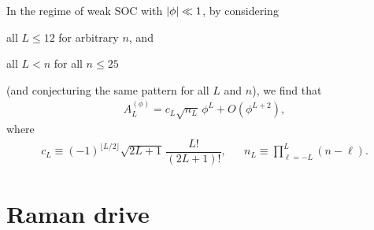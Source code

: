 \documentclass[nofootinbib,notitlepage,11pt]{revtex4-2}
\newcommand{\f}[2]{\dfrac{#1}{#2}} %
\newcommand{\p}[1]{\left(#1\right)} %
\newcommand{\1}{\mathds{1}}
\begin{document}
In the regime of weak SOC with $\abs{\phi}\ll1$, by considering
\begin{enumerate*}
\item all $L\le12$ for arbitrary $n$, and
\item all $L<n$ for all $n\le25$
\end{enumerate*}
(and conjecturing the same pattern for all $L$ and $n$), we find that
\begin{align}
  A_L^{(\phi)} = c_L \sqrt{n_L}\, \phi^L + O\p{\phi^{L+2}},
  \label{eq:A_L_phi_small}
\end{align}
where
\begin{align}
  c_L \equiv \p{-1}^{\lfloor L/2\rfloor}
  \sqrt{2L+1}\, \f{L!}{\p{2L+1}!},
  &&
  n_L \equiv \prod_{\ell=-L}^L\p{n-\ell}.
\end{align}

\section{Raman drive}
\label{sec:drive_raman}
\end{document}
